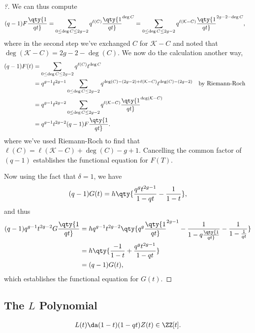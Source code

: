 \begin{proof}[?]
We can thus compute
\begin{align*}  
(q-1) F\qty{1\over qt}
&= \sum_{0\leq \deg C \leq 2g-2} q^{\ell(C)} \qty{1\over qt}^{\deg C} = \sum_{0\leq \deg C \leq 2g-2} q^{\ell(\mathcal{K} - C)} \qty{1\over qt}^{2g-2-\deg C}
,\end{align*} where in the second step we've exchanged \(C\) for
\(\mathcal{K}- C\) and noted that
\(\deg(\mathcal{K}-C) = 2g-2-\deg(C)\). We now do the calculation
another way,
\begin{align*}  
(q-1) F(t) 
&= \sum_{0\leq \deg C \leq 2g-2} q^{\ell(C)} t^{\deg C} \\
&=
q^{g-1} t^{2g-1} \sum_{0\leq \deg C \leq 2g-2} q^{\deg(C) - (2g-2) + \ell(\mathcal{K}-C)} t^{\deg(C) - (2g-2)} && \text{by Riemann-Roch} \\
&= q^{g-1} t^{2g-2} \sum_{0 \leq \deg C \leq 2g-2} q^{\ell(\mathcal{K} - C)} \qty{1\over qt}^{\deg(\mathcal{K} - C)} \\
&= q^{g-1} t^{2g-2} (q-1) F\qty{1\over qt}
.\end{align*} where we've used Riemann-Roch to find that
\(\ell(C) = \ell(\mathcal{K}-C) + \deg(C) - g + 1\). Cancelling the
common factor of \((q-1)\) establishes the functional equation for
\(F(T)\).

Now using the fact that \(\delta = 1\), we have
\begin{align*}  
(q-1)G(t) = h \qty{ {q^g t^{2g-1} \over 1-qt} - {1\over 1-t} }
,\end{align*} and thus
\begin{align*}  
(q-1) q^{g-1} t^{2g-2} G\qty{1\over qt}
&= hq^{g-1} t^{2g-2} \qty{q^g \qty{1\over qt}^{2g-1} - {1\over 1 - q \qty{1\over qt}} - {1\over 1 - {1\over qt}} } \\
&=
h\qty{ {-1\over 1-t} + {q^g t^{2g-1} \over 1-qt}} \\
&= (q-1) G(t)
,\end{align*} which establishes the functional equation for \(G(t)\).

\end{proof}

\hypertarget{the-l-polynomial}{%
\subsection{\texorpdfstring{The \(L\)
Polynomial}{The L Polynomial}}\label{the-l-polynomial}}

\begin{definition}

\begin{align*}  
L(t) \da (1-t) (1-qt)  Z(t) \in \ZZ[t]
.\end{align*}

\end{definition}


